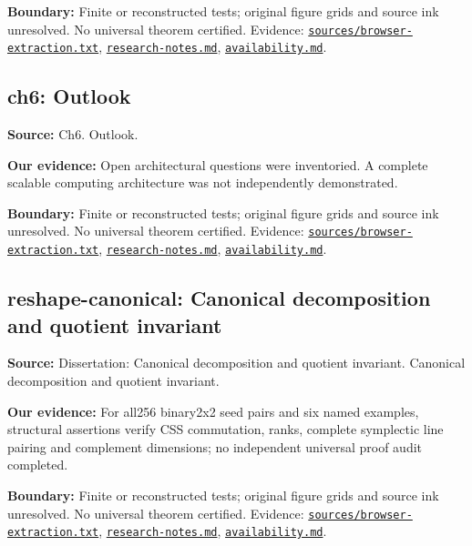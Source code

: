 \documentclass[11pt]{article}
\begin{document}
\textbf{Boundary:} Finite or reconstructed tests; original figure grids and source ink unresolved. No universal theorem certified. Evidence: \href{https://github.com/alectionary/vibe-math/blob/master/formalization/quintavalle-hgp/sources/browser-extraction.txt}{\nolinkurl{sources/browser-extraction.txt}}, \href{https://github.com/alectionary/vibe-math/blob/master/formalization/quintavalle-hgp/research-notes.md}{\nolinkurl{research-notes.md}}, \href{https://github.com/alectionary/vibe-math/blob/master/formalization/quintavalle-hgp/availability.md}{\nolinkurl{availability.md}}.
\subsection{ch6: Outlook}
\label{claim:ch6}
\textbf{Source:} Ch6. Outlook.

\textbf{Our evidence:} Open architectural questions were inventoried. A complete scalable computing architecture was not independently demonstrated.

\textbf{Boundary:} Finite or reconstructed tests; original figure grids and source ink unresolved. No universal theorem certified. Evidence: \href{https://github.com/alectionary/vibe-math/blob/master/formalization/quintavalle-hgp/sources/browser-extraction.txt}{\nolinkurl{sources/browser-extraction.txt}}, \href{https://github.com/alectionary/vibe-math/blob/master/formalization/quintavalle-hgp/research-notes.md}{\nolinkurl{research-notes.md}}, \href{https://github.com/alectionary/vibe-math/blob/master/formalization/quintavalle-hgp/availability.md}{\nolinkurl{availability.md}}.
\subsection{reshape-canonical: Canonical decomposition and quotient invariant}
\label{claim:reshape-canonical}
\textbf{Source:} Dissertation: Canonical decomposition and quotient invariant. Canonical decomposition and quotient invariant.

\textbf{Our evidence:} For all256 binary2x2 seed pairs and six named examples, structural assertions verify CSS commutation, ranks, complete symplectic line pairing and complement dimensions; no independent universal proof audit completed.

\textbf{Boundary:} Finite or reconstructed tests; original figure grids and source ink unresolved. No universal theorem certified. Evidence: \href{https://github.com/alectionary/vibe-math/blob/master/formalization/quintavalle-hgp/sources/browser-extraction.txt}{\nolinkurl{sources/browser-extraction.txt}}, \href{https://github.com/alectionary/vibe-math/blob/master/formalization/quintavalle-hgp/research-notes.md}{\nolinkurl{research-notes.md}}, \href{https://github.com/alectionary/vibe-math/blob/master/formalization/quintavalle-hgp/availability.md}{\nolinkurl{availability.md}}.
\end{document}

